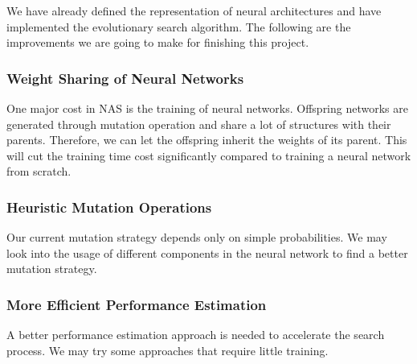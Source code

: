 \documentclass[conference]{IEEEtran}
\begin{document}
 We have already defined the representation of neural architectures and have implemented the evolutionary search algorithm. The following are the improvements we are going to make for finishing this project.
 
  
  \subsubsection{Weight Sharing of Neural Networks}    
  One major cost in NAS is the training of neural networks. Offspring networks are generated through mutation operation and share a lot of structures with their parents. Therefore, we can let the offspring inherit the weights of its parent. This will cut the training time cost significantly compared to training a neural network from scratch.
  
  \subsubsection{Heuristic Mutation Operations}
  Our current mutation strategy depends only on simple probabilities. We may look into the usage of different components in the neural network to find a better mutation strategy.

  \subsubsection{More Efficient Performance Estimation}
  A better performance estimation approach is needed to accelerate the search process. We may try some approaches that require little training.
   



\end{document}
